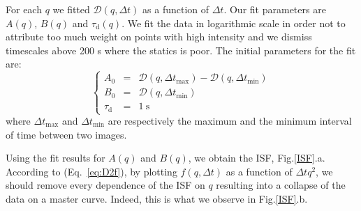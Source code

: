 \documentclass[%
 aip,
 jmp,%
 amsmath,amssymb,
reprint,%
]{revtex4-1}
\begin{document}
For each $q$ we fitted $\mathcal{D}(q, \Delta t)$ as a function of $\Delta t$. Our fit parameters are $A(q)$, $B(q)$ and $\tau_\text{d}(q)$. We fit the data in logarithmic scale in order not to attribute too much weight on points with high intensity and we dismiss timescales above 200 s where the statics is poor. The initial parameters for the fit are:
\begin{equation}
\left\{
\begin{array}{rcl}
A_0 &=& \mathcal{D} (q,\Delta t_\text{max}) - \mathcal{D} (q,\Delta t_\text{min}) \\
B_0 &=& \mathcal{D} (q,\Delta t_\text{min}) \\
\tau_\text{d} &=& \SI{1}{\second}
\end{array}
\right.
\end{equation}
where $\Delta t_\text{max}$ and $\Delta t_\text{min}$ are respectively the maximum and the minimum interval of time between two images.

Using the fit results for $A(q)$ and $B(q)$, we obtain the ISF, Fig.\ref{ISF}.a. According to (Eq.~\ref{eq:D2f}), by plotting $f(q, \Delta t)$ as a function of $\Delta t q^2$, we should remove every dependence of the ISF on $q$ resulting into a collapse of the data on a master curve. Indeed, this is what we observe in Fig.\ref{ISF}.b. 
\end{document}
